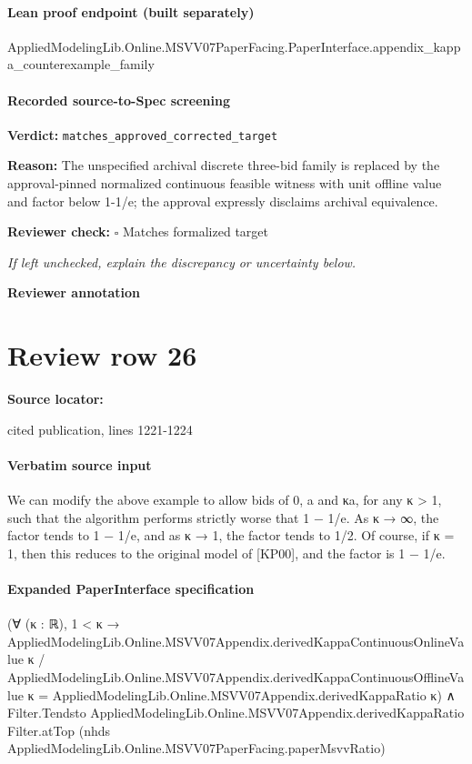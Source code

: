 \documentclass[10pt]{article}
\newcommand{\reviewerbox}{%
  \par\noindent\fbox{\parbox{0.96\linewidth}{\rule{0pt}{0.38in}}}\par
}
\newcommand{\reviewmatch}[1]{%
  \par\noindent\textbf{Reviewer check:} $\square$\; #1\par
  \noindent\emph{If left unchecked, explain the discrepancy or uncertainty below.}\par
}
\begin{document}
\paragraph{Lean proof endpoint (built separately)}\begin{ReviewVerbatim}
AppliedModelingLib.Online.MSVV07PaperFacing.PaperInterface.appendix_kappa_counterexample_family
\end{ReviewVerbatim}

\paragraph{Recorded source-to-Spec screening}
\textbf{Verdict:} \texttt{matches\_approved\_corrected\_target}
\\
{\raggedright
\textbf{Reason:} The unspecified archival discrete three-\allowbreak{}bid family is replaced by the approval-\allowbreak{}pinned normalized continuous feasible witness with unit offline value and factor below 1-\allowbreak{}1/\allowbreak{}e;\allowbreak{} the approval expressly disclaims archival equivalence.\allowbreak{}
\par}
\reviewmatch{Matches formalized target}
\noindent\textbf{Reviewer annotation}\par
\reviewerbox
\clearpage
\hypertarget{source-claim-5f4119723bf38020}{}
\section*{Review row 26}
\textbf{Source locator:} {\footnotesize\raggedright cited publication, lines 1221-\allowbreak{}1224\par}
\paragraph{Verbatim source input}
\begin{ReviewVerbatim}
We can modify the above example to allow bids of 0, a and κa, for any κ > 1, such that the
algorithm performs strictly worse that 1 − 1/e.
As κ → ∞, the factor tends to 1 − 1/e, and as κ → 1, the factor tends to 1/2. Of course, if
κ = 1, then this reduces to the original model of [KP00], and the factor is 1 − 1/e.
\end{ReviewVerbatim}



\paragraph{Expanded PaperInterface specification}
\begin{ReviewVerbatim}
(∀ (κ : ℝ),
    1 < κ →
      AppliedModelingLib.Online.MSVV07Appendix.derivedKappaContinuousOnlineValue κ /
          AppliedModelingLib.Online.MSVV07Appendix.derivedKappaContinuousOfflineValue κ =
        AppliedModelingLib.Online.MSVV07Appendix.derivedKappaRatio κ) ∧
  Filter.Tendsto AppliedModelingLib.Online.MSVV07Appendix.derivedKappaRatio Filter.atTop
    (nhds AppliedModelingLib.Online.MSVV07PaperFacing.paperMsvvRatio)
\end{ReviewVerbatim}
\end{document}
